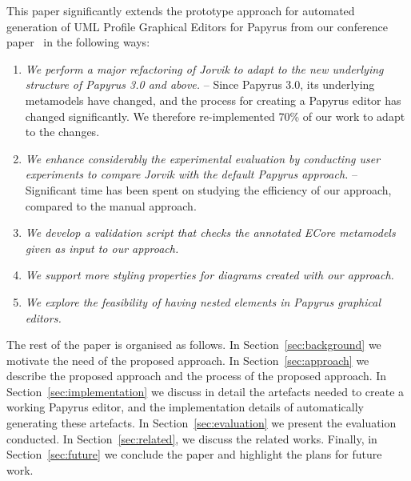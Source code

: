 This paper significantly extends the prototype approach for automated generation of UML Profile Graphical Editors for Papyrus from our conference paper~\cite{zolotas2018towards} in the following ways:
\begin{enumerate}
	\item \textit{We perform a major refactoring of Jorvik to adapt to the new underlying structure of Papyrus 3.0 and above.} --
	Since Papyrus 3.0, its underlying metamodels have changed, and the process for creating a Papyrus editor has changed significantly. 
	We therefore re-implemented 70\% of our work to adapt to the changes.
	\item \textit{We enhance considerably the experimental evaluation by conducting user experiments to compare Jorvik with the default Papyrus approach.} --
	Significant time has been spent on studying the efficiency of our approach, compared to the manual approach.
	\item \textit{We develop a validation script that checks the annotated ECore metamodels given as input to our approach.}
	\item \textit{We support more styling properties for diagrams created with our approach.}
	\item \textit{We explore the feasibility of having nested elements in Papyrus graphical editors.} 
\end{enumerate}
The rest of the paper is organised as follows. 
In Section~\ref{sec:background} we motivate the need of the proposed approach. 
In Section~\ref{sec:approach} we describe the proposed approach and the process of the proposed approach. 
In Section~\ref{sec:implementation} we discuss in detail the artefacts needed to create a working Papyrus editor, and the implementation details of automatically generating these artefacts. 
In Section~\ref{sec:evaluation} we present the evaluation conducted.
In Section~\ref{sec:related}, we discuss the related works. 
Finally, in Section~\ref{sec:future} we conclude the paper and highlight the plans for future work.
